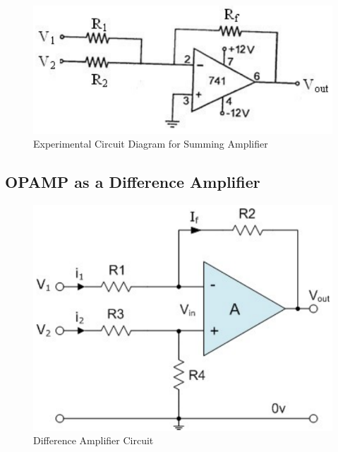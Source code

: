 
\begin{figure}[H]
    \centering
    \includegraphics[width=0.8\columnwidth]{images/sum2.png}
    \caption{Experimental Circuit Diagram for Summing Amplifier}
    \label{sum2}
\end{figure}

\subsection{OPAMP as a Difference Amplifier}

\begin{figure}[H]
    \centering
    \includegraphics[width=0.8\columnwidth]{images/diff1.png}
    \caption{Difference Amplifier Circuit}
    \label{diff1}
\end{figure}

